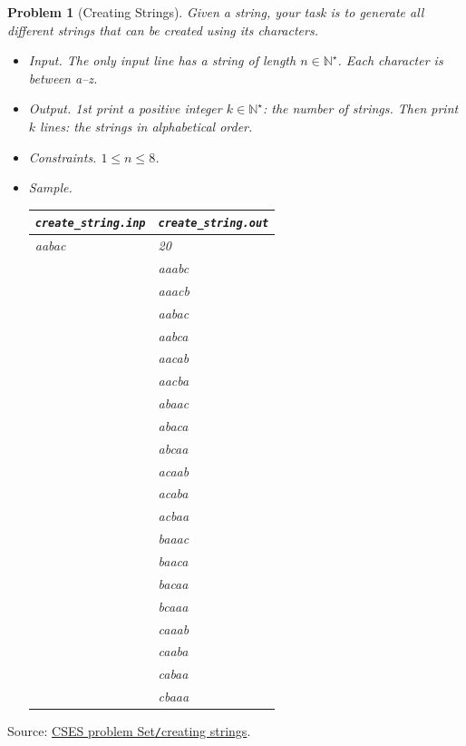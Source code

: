 \documentclass{article}
\newtheorem{problem}{Problem}
\begin{document}
\begin{problem}[Creating Strings]
	Given a string, your task is to generate all different strings that can be created using its characters.
	\begin{itemize}
		\item {\sf Input.} The only input line has a string of length $n\in\mathbb{N}^\star$. Each character is between a--z.
		\item {\sf Output.} 1st print a positive integer $k\in\mathbb{N}^\star$: the number of strings. Then print $k$ lines: the strings in alphabetical order.		
		\item {\sf Constraints.} $1\le n\le8$.
		\item {\sf Sample.}
		\begin{table}[H]
			\centering
			\begin{tabular}{|l|l|}
				\hline
				\verb|create_string.inp| & \verb|create_string.out| \\
				\hline
				aabac & 20 \\
				& aaabc \\
				& aaacb \\
				& aabac \\
				& aabca \\
				& aacab \\
				& aacba \\
				& abaac \\
				& abaca \\
				& abcaa \\
				& acaab \\
				& acaba \\
				& acbaa \\
				& baaac \\
				& baaca \\
				& bacaa \\
				& bcaaa \\
				& caaab \\
				& caaba \\
				& cabaa \\
				& cbaaa \\
				\hline
			\end{tabular}
		\end{table}
	\end{itemize}
\end{problem}
Source: \href{https://cses.fi/problemset/task/1622}{CSES problem Set{\tt/}creating strings}.
\end{document}

